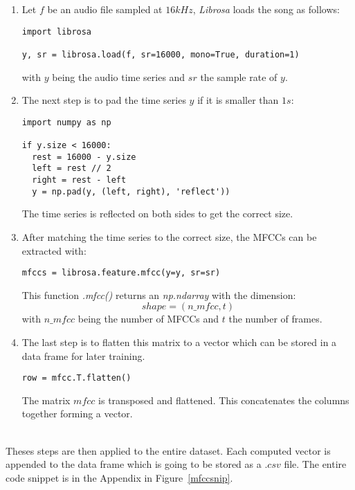 \begin{enumerate}[label=\arabic*.]
  \item Let $f$ be an audio file sampled at $16kHz$, \textit{Librosa} loads the
song as follows:
\begin{lstlisting}
import librosa

y, sr = librosa.load(f, sr=16000, mono=True, duration=1)
\end{lstlisting}
with $y$ being the audio time series and $sr$ the sample rate of $y$.\\
\item The next step is to pad the time series $y$ if it is smaller than $1s$:
\begin{lstlisting}
import numpy as np

if y.size < 16000:
  rest = 16000 - y.size
  left = rest // 2
  right = rest - left
  y = np.pad(y, (left, right), 'reflect'))
\end{lstlisting}
The time series is reflected on both sides to get the correct size.\\
\item After matching the time series to the correct size, the MFCCs can be extracted
with:
\begin{lstlisting}
mfccs = librosa.feature.mfcc(y=y, sr=sr)
\end{lstlisting}
This function \textit{.mfcc()} returns an \textit{np.ndarray} with the dimension:
\begin{equation*}
  shape=(n\_mfcc,t) 
\end{equation*}
with $n\_mfcc$ being the number of MFCCs and $t$ the number of frames.
\item The last step is to flatten this matrix to a vector which can be stored in a
  data frame for later training.
\begin{lstlisting}
row = mfcc.T.flatten() 
\end{lstlisting}
The matrix $mfcc$ is transposed and flattened. This concatenates the columns
together forming a vector.
\end{enumerate}~\\
Theses steps are then applied to the entire dataset. Each computed vector is
appended to the data frame which is going to be stored as a $.csv$ file. The
entire code snippet is in the Appendix in Figure~\ref{mfccsnip}.
